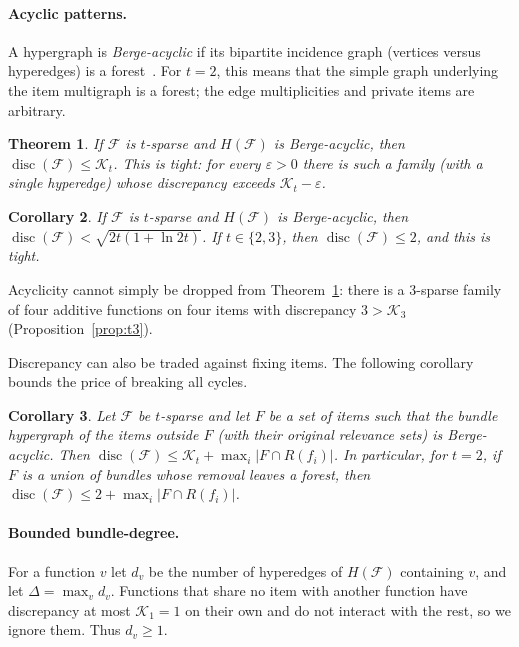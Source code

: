 \documentclass[11pt,letterpaper]{article}
\newtheorem{theorem}{Theorem}[section]
\newtheorem{corollary}[theorem]{Corollary}
\theoremstyle{definition}
\newcommand{\cF}{\mathcal{F}}
\DeclareMathOperator{\disc}{disc}
\begin{document}
\paragraph{Acyclic patterns.}
A hypergraph is \emph{Berge-acyclic} if its bipartite incidence graph (vertices versus hyperedges)
is a forest~\cite{Ber89}. For $t=2$, this means that the simple graph underlying the item
multigraph is a forest; the edge multiplicities and private items are arbitrary.

\begin{theorem}\label{thm:A}
If $\cF$ is $t$-sparse and $H(\cF)$ is Berge-acyclic, then $\disc(\cF)\le \mathcal{K}_t$. This is tight:
for every $\varepsilon>0$ there is such a family (with a single hyperedge) whose discrepancy
exceeds $\mathcal{K}_t-\varepsilon$.
\end{theorem}

\begin{corollary}\label{cor:A}
If $\cF$ is $t$-sparse and $H(\cF)$ is Berge-acyclic, then $\disc(\cF)<\sqrt{2t(1+\ln 2t)}$. If
$t\in\{2,3\}$, then $\disc(\cF)\le2$, and this is tight.
\end{corollary}

Acyclicity cannot simply be dropped from Theorem~\ref{thm:A}: there is a $3$-sparse family of four
additive functions on four items with discrepancy $3>\mathcal{K}_3$ (Proposition~\ref{prop:t3}).

Discrepancy can also be traded against fixing items. The following corollary bounds the price
of breaking all cycles.

\begin{corollary}\label{cor:B}
Let $\cF$ be $t$-sparse and let $F$ be a set of items such that the bundle hypergraph of the
items outside $F$ (with their original relevance sets) is Berge-acyclic. Then
$\disc(\cF)\le \mathcal{K}_t+\max_i|F\cap R(f_i)|$. In particular, for $t=2$, if $F$ is a union of bundles
whose removal leaves a forest, then $\disc(\cF)\le 2+\max_i|F\cap R(f_i)|$.
\end{corollary}

\paragraph{Bounded bundle-degree.}
For a function $v$ let $d_v$ be the number of hyperedges of $H(\cF)$ containing $v$, and let
$\Delta=\max_vd_v$. Functions that share no item with another function have discrepancy at most
$\mathcal{K}_1=1$ on their own and do not interact with the rest, so we ignore them. Thus $d_v\ge1$.
\end{document}
